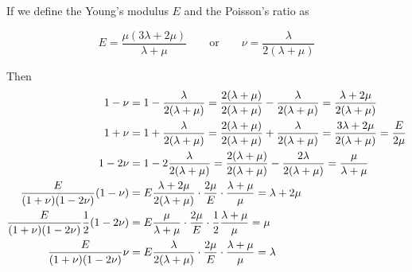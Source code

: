 If we define the Young's modulus $E$ and 
the Poisson's ratio as
\begin{mdframed}[backgroundcolor=blue!5]
\begin{equation}
E=\frac{\mu(3\lambda+2\mu)}{\lambda+\mu}
\qquad
\textrm{or}
\qquad
\nu=\frac{\lambda}{2(\lambda+\mu)}
\end{equation}
\end{mdframed}

Then 
\begin{align}
1-\nu
&=1-\frac{\lambda}{2(\lambda+\mu)}
=\frac{2(\lambda+\mu)}{2(\lambda+\mu)}-\frac{\lambda}{2(\lambda+\mu)}
=\frac{\lambda+2\mu}{2(\lambda+\mu)} \nn\\
1+\nu 
&= 1+\frac{\lambda}{2(\lambda+\mu)}
= \frac{2(\lambda+\mu)}{2(\lambda+\mu)}+\frac{\lambda}{2(\lambda+\mu)}
= \frac{3\lambda+2\mu}{2(\lambda+\mu)}
= \frac{E}{2\mu} \nn\\
1-2\nu 
&=1 -2 \frac{\lambda}{2(\lambda+\mu)} 
= \frac{2(\lambda+\mu)}{2(\lambda+\mu)}-\frac{2\lambda}{2(\lambda+\mu)}
= \frac{\mu}{\lambda+\mu} 
\nn\\ %
\frac{E}{(1+\nu)(1-2\nu)}(1-\nu)
&=
E
\frac{\lambda+2\mu}{2(\lambda+\mu)}
\cdot
\frac{2\mu}{E}
\cdot
\frac{\lambda+\mu}{\mu}
=\lambda+2\mu 
\nn\\ %
\frac{E}{(1+\nu)(1-2\nu)} \frac12(1-2\nu)
&=
E
\frac{\mu}{\lambda+\mu}
\cdot
\frac{2\mu}{E}
\cdot
\frac12 \frac{\lambda+\mu}{\mu} 
= \mu 
\nn\\ %
\frac{E}{(1+\nu)(1-2\nu)} \nu
&=
E\frac{\lambda}{2(\lambda+\mu)}
\cdot
\frac{2\mu}{E}
\cdot
\frac{\lambda+\mu}{\mu} 
= \lambda \nn
\end{align}

